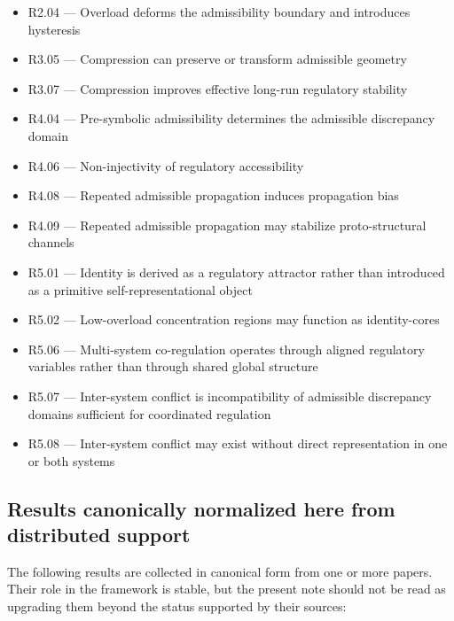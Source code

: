 \documentclass[12pt]{article}
\begin{document}
	\begin{itemize}[leftmargin=2em]
		\item R2.04 --- Overload deforms the admissibility boundary and introduces hysteresis
		\item R3.05 --- Compression can preserve or transform admissible geometry
		\item R3.07 --- Compression improves effective long-run regulatory stability
		\item R4.04 --- Pre-symbolic admissibility determines the admissible discrepancy domain
		\item R4.06 --- Non-injectivity of regulatory accessibility
		\item R4.08 --- Repeated admissible propagation induces propagation bias
		\item R4.09 --- Repeated admissible propagation may stabilize proto-structural channels
		\item R5.01 --- Identity is derived as a regulatory attractor rather than introduced as a primitive self-representational object
		\item R5.02 --- Low-overload concentration regions may function as identity-cores
		\item R5.06 --- Multi-system co-regulation operates through aligned regulatory variables rather than through shared global structure
		\item R5.07 --- Inter-system conflict is incompatibility of admissible discrepancy domains sufficient for coordinated regulation
		\item R5.08 --- Inter-system conflict may exist without direct representation in one or both systems
	\end{itemize}
	
	\subsection{Results canonically normalized here from distributed support}
	
	The following results are collected in canonical form from one or more papers. Their role in the
	framework is stable, but the present note should not be read as upgrading them beyond the status
	supported by their sources:
	
\end{document}
